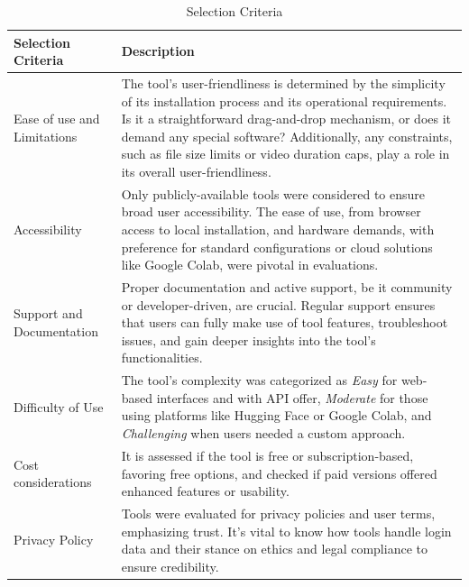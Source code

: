 \begin{table}[htpb]
	\caption{Selection Criteria}\label{tab:selection_criteria}
	\centering
	\small
	\begin{tabularx}{\textwidth}{l X}
		\toprule
		\textbf{Selection Criteria} & \textbf{Description}                                      \\
		\midrule
		Ease of use and Limitations & The tool's user-friendliness is determined
		by the simplicity of its installation process and its operational
		requirements. Is it a straightforward drag-and-drop mechanism, or does
		it demand any special software? Additionally, any constraints, such
		as file size limits or video duration caps, play a role in its overall
		user-friendliness.                                                                      \\
		\addlinespace
		Accessibility               & Only publicly-available tools were considered
		to ensure broad user accessibility. The ease of use, from browser access
		to local installation, and hardware demands, with preference for
		standard configurations or cloud solutions like Google Colab,
		were pivotal in evaluations.                                                            \\
		\addlinespace
		Support and Documentation   & Proper documentation and active support,
		be it community or developer-driven, are crucial. Regular support
		ensures that users can fully make use of tool features, troubleshoot issues,
		and gain deeper insights into the tool's functionalities.                               \\
		\addlinespace
		Difficulty of Use           & The tool's complexity was categorized as
		\textit{Easy} for web-based interfaces and with \ac{API} offer, \textit{Moderate} for those using
		platforms like Hugging Face or Google Colab, and \textit{Challenging}
		when users needed a custom approach.                                                    \\
		\addlinespace
		Cost considerations         & It is assessed if the tool is free or
		subscription-based, favoring free options, and checked if paid versions
		offered enhanced features or usability.                                                 \\
		\addlinespace
		Privacy Policy              & Tools were evaluated for privacy policies and user terms,
		emphasizing trust. It's vital to know how tools handle login data and their
		stance on ethics and legal compliance to ensure credibility.                            \\
		\bottomrule
	\end{tabularx}
\end{table}

